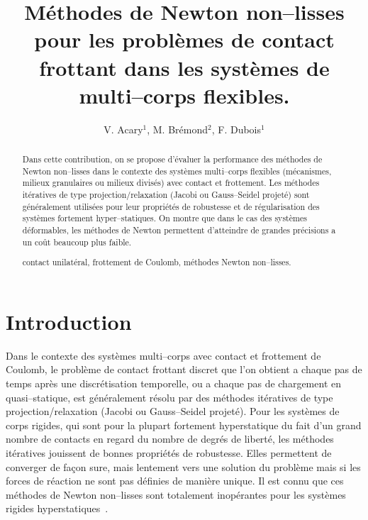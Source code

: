 \documentclass{CSMA2017}
\title{Méthodes de Newton non--lisses pour les problèmes de contact frottant dans les systèmes de multi--corps flexibles.}
\author{V. Acary$^1$, M. Brémond$^2$, F. Dubois$^1$}
\begin{document}
\maketitle

\begin{abstract}
Dans cette contribution, on se propose d'évaluer la performance des méthodes de Newton non--lisses dans le contexte des systèmes multi--corps flexibles (mécanismes, milieux granulaires ou milieux divisés) avec contact et frottement. Les méthodes itératives de type projection/relaxation (Jacobi ou Gauss--Seidel projeté) sont généralement utilisées pour leur propriétés de robustesse et de régularisation des systèmes fortement hyper--statiques. On montre que dans le cas des systèmes déformables, les méthodes de Newton permettent d'atteindre de grandes précisions a un coût beaucoup plus faible.

\keywords contact unilatéral, frottement de Coulomb, méthodes Newton non--lisses.
\end{abstract}

\section{Introduction}

Dans le contexte des systèmes multi--corps avec contact et frottement de Coulomb, le problème de contact frottant discret que l'on obtient a chaque pas de temps après une discrétisation temporelle, ou a chaque pas de chargement en quasi--statique, est généralement résolu par des méthodes itératives de type projection/relaxation (Jacobi ou Gauss--Seidel projeté). 
%
Pour les systèmes de corps rigides, qui sont pour la plupart fortement hyperstatique du fait d'un grand nombre de contacts en regard du nombre de degrés de liberté, les méthodes itératives jouissent de bonnes propriétés de robustesse. Elles permettent de converger de façon sure, mais lentement vers une solution du problème mais si les forces de réaction ne sont pas définies de manière unique. Il est connu que ces méthodes de Newton non--lisses sont totalement inopérantes pour les systèmes rigides hyperstatiques~\cite{bertailsdescoubes:inria-00557706, ??}.
\end{document}
